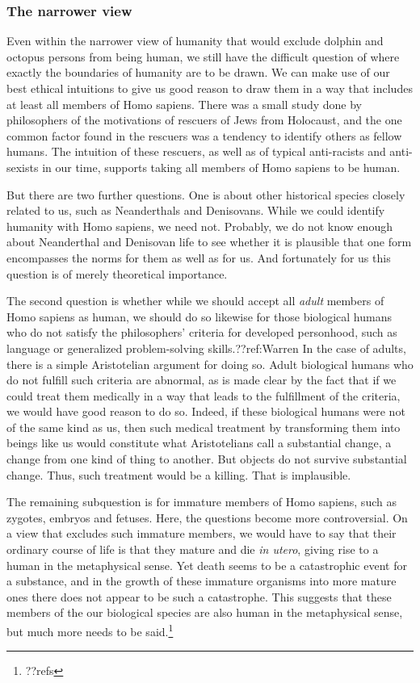 \subsubsection{The narrower view}
Even within the narrower view of humanity that would exclude dolphin and octopus persons from being human, we still have the difficult question of where exactly the boundaries of humanity are to be drawn. 
We can make use of our best ethical intuitions to give us good reason to draw them in a way that includes at least all 
members of Homo sapiens. There was a small study done by philosophers of the motivations of rescuers of Jews from Holocaust, and the one common
factor found in the rescuers was a tendency to identify others as fellow humans. The intuition of these rescuers, as well as of typical anti-racists and 
anti-sexists in our time, supports taking all members of Homo sapiens to be human. 

But there are two further questions. One is about other historical species closely related to us, such as Neanderthals and Denisovans. While we could
identify humanity with Homo sapiens, we need not. Probably, we do not know enough about Neanderthal and Denisovan life to see whether it is 
plausible that one form encompasses the norms for them as well as for us. And fortunately for us this question is of merely theoretical importance.

The second question is whether while we should accept all \textit{adult} members of Homo sapiens as human, we should do so likewise for those 
biological humans who do not satisfy the philosophers' criteria for developed personhood, such as language or generalized problem-solving skills.??ref:Warren
In the case of adults, there is a simple Aristotelian argument for doing so. Adult biological humans who do not fulfill such criteria are abnormal, as is made clear
by the fact that if we could treat them medically in a way that leads to the fulfillment of the criteria, we would have good reason to do so. Indeed, if these
biological humans were not of the same kind as us, then such medical treatment by transforming them into beings like us would constitute what Aristotelians
call a substantial change, a change from one kind of thing to another. But objects do not survive substantial change. Thus, such treatment would be a killing.
That is implausible.

The remaining subquestion is for immature members of Homo sapiens, such as zygotes, embryos and fetuses. Here, the questions become more controversial.
On a view that excludes such immature members, we would have to say that their ordinary course of life is that they mature and die \textit{in utero}, giving
rise to a human in the metaphysical sense. Yet death seems to be a catastrophic event for a substance, and in the growth of these immature organisms into more mature ones
there does not appear to be such a catastrophe. This suggests that these members of the our biological species are also human in the metaphysical sense, but much
more needs to be said.\footnote{??refs}

